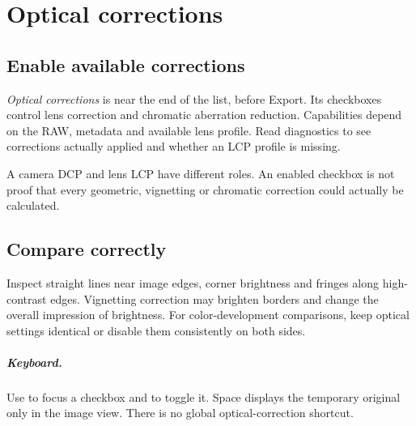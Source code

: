 \chapter{Optical corrections}
\section{Enable available corrections}
\emph{Optical corrections} is near the end of the list, before Export.
Its checkboxes control lens correction and chromatic aberration reduction.
Capabilities depend on the RAW, metadata and available lens profile.
Read diagnostics to see corrections actually applied and whether an LCP
profile is missing.

A camera DCP and lens LCP have different roles. An enabled checkbox is not
proof that every geometric, vignetting or chromatic correction could actually
be calculated.

\section{Compare correctly}
Inspect straight lines near image edges, corner brightness and fringes along
high-contrast edges. Vignetting correction may brighten borders and change
the overall impression of brightness. For color-development comparisons,
keep optical settings identical or disable them consistently on both sides.

\paragraph{Keyboard.}
Use  to focus a checkbox and  to toggle it.
Space displays the temporary original only in the image view. There is no
global optical-correction shortcut.
